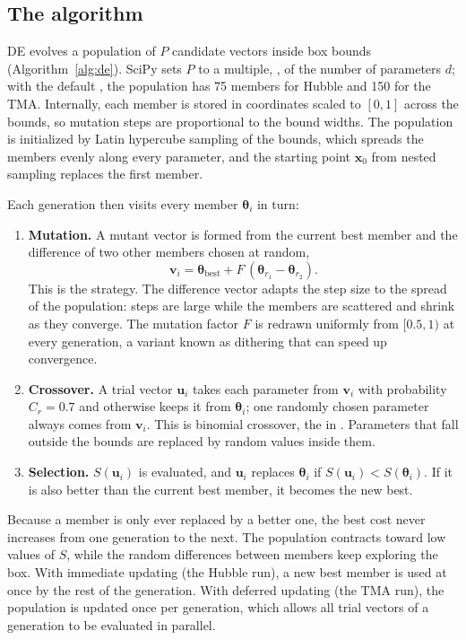 \subsection{The algorithm}
DE evolves a population of $P$ candidate vectors inside box bounds (Algorithm~\ref{alg:de}). SciPy sets $P$ to a multiple, , of the number of parameters $d$; with the default , the population has 75 members for Hubble and 150 for the TMA. Internally, each member is stored in coordinates scaled to $[0,1]$ across the bounds, so mutation steps are proportional to the bound widths. The population is initialized by Latin hypercube sampling of the bounds, which spreads the members evenly along every parameter, and the starting point $\mathbf{x}_0$ from nested sampling replaces the first member.

Each generation then visits every member $\boldsymbol{\theta}_i$ in turn:
\begin{enumerate}
    \item \textbf{Mutation.} A mutant vector is formed from the current best member and the difference of two other members chosen at random,
    \begin{equation}
    \mathbf{v}_i = \boldsymbol{\theta}_{\mathrm{best}} + F\,(\boldsymbol{\theta}_{r_1} - \boldsymbol{\theta}_{r_2}).
    \end{equation}
    This is the  strategy. The difference vector adapts the step size to the spread of the population: steps are large while the members are scattered and shrink as they converge. The mutation factor $F$ is redrawn uniformly from $[0.5,1)$ at every generation, a variant known as dithering that can speed up convergence.
    \item \textbf{Crossover.} A trial vector $\mathbf{u}_i$ takes each parameter from $\mathbf{v}_i$ with probability $C_r=0.7$ and otherwise keeps it from $\boldsymbol{\theta}_i$; one randomly chosen parameter always comes from $\mathbf{v}_i$. This is binomial crossover, the  in . Parameters that fall outside the bounds are replaced by random values inside them.
    \item \textbf{Selection.} $S(\mathbf{u}_i)$ is evaluated, and $\mathbf{u}_i$ replaces $\boldsymbol{\theta}_i$ if $S(\mathbf{u}_i)<S(\boldsymbol{\theta}_i)$. If it is also better than the current best member, it becomes the new best.
\end{enumerate}
Because a member is only ever replaced by a better one, the best cost never increases from one generation to the next. The population contracts toward low values of $S$, while the random differences between members keep exploring the box. With immediate updating (the Hubble run), a new best member is used at once by the rest of the generation. With deferred updating (the TMA run), the population is updated once per generation, which allows all trial vectors of a generation to be evaluated in parallel.

